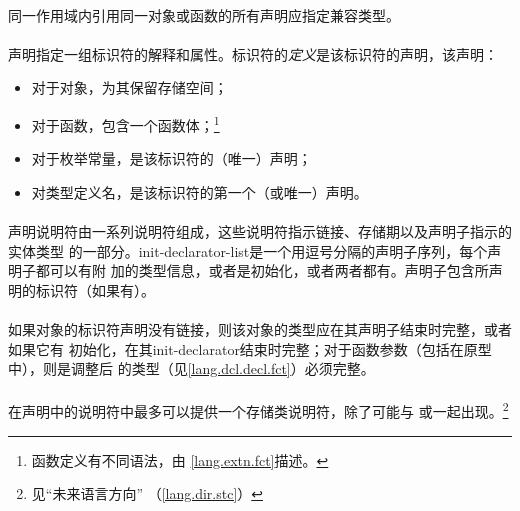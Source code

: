 {\paragraph{}
同一作用域内引用同一对象或函数的所有声明应指定兼容类型。

\semantic
\paragraph{}
声明指定一组标识符的解释和属性。标识符的\textit{定义}是该标识符的声明，该声明：
\begin{itemize}
  \item{对于对象，为其保留存储空间；}
  \item{对于函数，包含一个函数体；\footnote{函数定义有不同语法，由
    \ref{lang.extn.fct}描述。}}
  \item{对于枚举常量，是该标识符的（唯一）声明；}
  \item{对类型定义名，是该标识符的第一个（或唯一）声明。}
\end{itemize}

\paragraph{}
声明说明符由一系列说明符组成，这些说明符指示链接、存储期以及声明子指示的实体类型
的一部分。init-declarator-list是一个用逗号分隔的声明子序列，每个声明子都可以有附
加的类型信息，或者是初始化，或者两者都有。声明子包含所声明的标识符（如果有）。

\paragraph{}
如果对象的标识符声明没有链接，则该对象的类型应在其声明子结束时完整，或者如果它有
初始化，在其init-declarator结束时完整；对于函数参数（包括在原型中），则是调整后
的类型（见\ref{lang.dcl.decl.fct}）必须完整。


\syntax
\paragraph{}

\constraint
\paragraph{}
在声明中的说明符中最多可以提供一个存储类说明符，除了可能与
或一起出现。\footnote{见``未来语言方向''
（\ref{lang.dir.stc}）}

}
